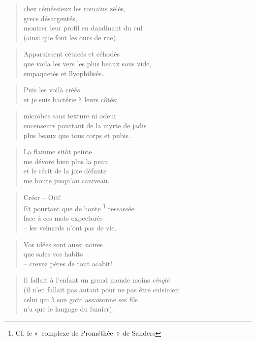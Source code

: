   \begin{verse}
    chez céméssieux les romains zélés,\\
    grecs désargentés,\\
    montrer leur profil en dandinant du cul\\
    (ainsi que font les ours de rue).
  \end{verse}
  \begin{verse}
    Apparaissent cétacés et céhodés\\
    que voila les vers les plus beaux sous vide,\\
    empaquetés et llyophilisés…
  \end{verse}
  \begin{verse}
    Puis les voilà créés\\
    et je suis bactérie à leurs côtés;
  \end{verse}
  \begin{verse}
    microbes sans texture ni odeur\\
    encenseurs pourtant de la myrte de jadis\\
    plus beaux que tous corps et pubis.
  \end{verse}
  \begin{verse}
    La flamme sitôt peinte\\
    me dévore bien plus la peau\\
    et le récit de la joie défunte\\
    me boute jusqu’au caniveau.
  \end{verse}
  \begin{verse}
    Créer -- \textsc{Oui!}\\
    Et pourtant que de honte
      \footnote{Cf. le «~complexe de Prométhée~» de Sanders}
      ressassée\\
    face à ces mots expectorés\\
    -- les veinards n’ont pas de vie.
  \end{verse}
  \begin{verse}
    Vos idées sont aussi noires\\
    que sales vos habits\\
    -- crevez pères de tout acabit!
  \end{verse}
  \begin{verse}
    Il fallait à l’enfant un grand monde moins \emph{cinglé}\\
    (il n’en fallait pas autant pour ne pas être cuisinier;\\
    celui qui à son goût assaisonne ses fils\\
    n’a que le langage du fumier).
  \end{verse}
